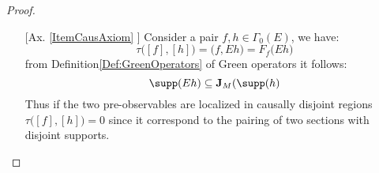 \documentclass[Main]{subfiles}
\begin{document}
\else
				\begin{proof}
					\forcenewline
					\begin{itemize}
						\item[ [Ax. \ref{ItemCausAxiom}]]
									Consider a pair $f,h \in \Gamma_0 (E)$, we have:
									\begin{displaymath}
										\tau \big([f] , [h] \big) = \big(f, Eh \big) = F_f \big( E h \big)
									\end{displaymath}
									from Definition\ref{Def:GreenOperators} of Green operators it follows:
									\begin{displaymath}
										\supp ( E h) \subseteq \textbf{J}_M ( \supp(h)
									\end{displaymath}
									Thus if the two pre-observables are localized in causally disjoint regions $\tau \big([f] , [h] \big)=0 $ since it correspond to the pairing of two sections with disjoint supports.


\end{itemize}
\end{proof}
\end{document}
